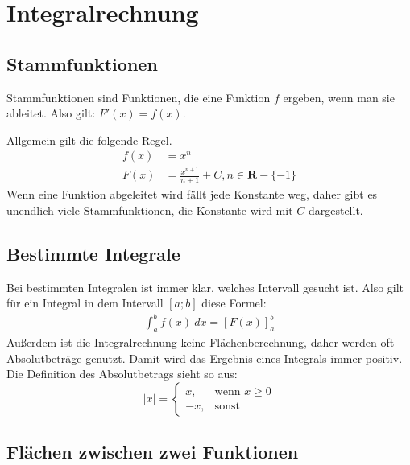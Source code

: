\chapter{Integralrechnung}

\section{Stammfunktionen}

\begin{flushleft}
    Stammfunktionen sind Funktionen, die eine Funktion $f$ ergeben, wenn man sie ableitet.
    Also gilt: $F'(x)=f(x)$.

    Allgemein gilt die folgende Regel.
    \begin{align}
        f(x)&=x^n \\
        F(x)&=\frac{x^{n+1}}{n+1}+C, n \in \mathbf{R} - \{-1\}
    \end{align}
    Wenn eine Funktion abgeleitet wird fällt jede Konstante weg, daher gibt es unendlich viele Stammfunktionen, die Konstante wird mit $C$ dargestellt.
\end{flushleft}

\section{Bestimmte Integrale}

\begin{flushleft}
    Bei bestimmten Integralen ist immer klar, welches Intervall gesucht ist.
    Also gilt für ein Integral in dem Intervall $[a;b]$ diese Formel:
    \begin{align}
        \int_{a}^{b} f(x) \ dx = [F(x)]_{a}^{b}
    \end{align}
    Außerdem ist die Integralrechnung keine Flächenberechnung, daher werden oft Absolutbeträge genutzt. Damit wird das Ergebnis eines Integrals immer positiv.
    Die Definition des Absolutbetrags sieht so aus:
    \[
        \mid x \mid =
        \begin{cases}
            x, &\text{wenn } x \geq 0 \\
            -x, &\text{sonst}
        \end{cases}
    \]
\end{flushleft}

\section{Flächen zwischen zwei Funktionen}

